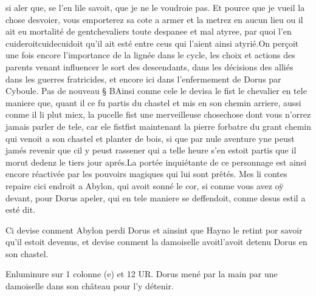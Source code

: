 \documentclass{article}
\begin{document}
\begin{pages}
      si aler que, se l’en lile savoit, que je ne le voudroie pas. 
      Et pource que je vueil la chose desvoier, vous emporterez sa cote a armer et la metrez en aucun lieu ou il ait eu mortalité de 
      gentchevaliers toute despanee et mal atyree, par quoi l’en 
      cuideroitcuidecuidoit qu’il ait esté entre ceus qui 
      l’aient ainsi atyrié.On perçoit une fois encore l'importance de la lignée dans le cycle,
      les choix et actions des parents venant influencer le sort des descendants, dans les décisions des alliés dans les guerres 
      fratricides, et encore ici dans l'enfermement de Dorus par Cyboule. \pend
\pstart Pas de nouveau § BAinsi conme cele le devisa le fist 
   le chevalier 
   en tele maniere que, quant il ce fu partis du chastel et mis en son chemin arriere, 
   aussi conme il li plut miex, la pucelle fist une 
   merveilleuse chosechose
   dont vous n'orrez jamais parler de tele, car ele fistfist maintenant 
   la pierre forbatre du grant chemin qui venoit a son chastel et planter de bois, 
   si que par nule aventure yne peust jamés revenir que cil y peust rassener 
   qui a telle heure s’en estoit partis que il morut dedenz le tiers jour aprés.La portée inquiétante 
   de ce personnage est ainsi encore réactivée par les pouvoirs magiques qui lui sont prêtés.
   Mes li contes repaire 
      cici endroit a Abylon, qui avoit 
   sonné le cor, si conme vous avez oÿ devant, pour Dorus apeler, qui en tele 
   maniere se deffendoit, conme desus estil a esté dit. \pend
         
         
            Ci devise 
               conment Abylon 
               perdi Dorus et ainsint que Hayno
               le retint por savoir qu’il estoit devenus, 
               et devise conment la damoiselle 
               avoitl'avoit detenu 
               Dorus 
               en son chastel.
            
               Enluminure sur 1 colonne (e) et 12 UR.
                  Dorus mené par la main par une
                  damoiselle dans 
                  son château 
                  pour l’y détenir. 
               

\end{pages}
\end{document}
